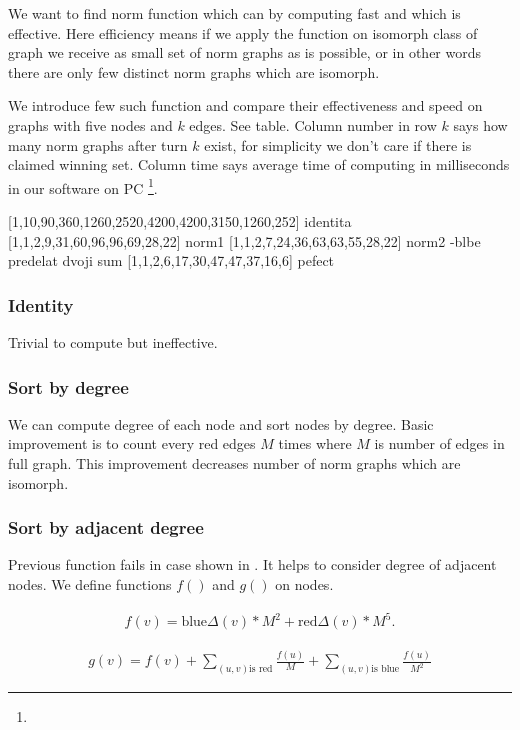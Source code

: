 We want to find norm function which can by computing fast and
which is effective. Here efficiency means if we apply the function on
isomorph class of graph we receive as small set of norm graphs as is possible,
or in other words there are only few distinct norm graphs which are isomorph.

We introduce few such function and compare their effectiveness and speed on
graphs with five nodes and $k$ edges. See table. Column number in row $k$ says
how many norm graphs after turn $k$ exist, for simplicity we don't care if
there is claimed winning set. Column time says average time of computing in
milliseconds in our software on PC \footnote{}.
 

[1,10,90,360,1260,2520,4200,4200,3150,1260,252] identita
[1,1,2,9,31,60,96,96,69,28,22] norm1
[1,1,2,7,24,36,63,63,55,28,22] norm2 -blbe predelat dvoji sum
[1,1,2,6,17,30,47,47,37,16,6] pefect

\subsubsection{Identity}
Trivial to compute but ineffective.

\subsubsection{Sort by degree}
We can compute degree of each node and sort nodes by degree. Basic improvement
is to count every red edges $M$ times where $M$ is number of edges in full
graph. This improvement decreases number of norm graphs which are isomorph.

\subsubsection{Sort by adjacent degree} Previous function fails in case shown
in . It helps to consider
degree of adjacent nodes. We define functions $f()$ and $g()$ on nodes. 

\begin{eqnarray*} 
f(v) = \mbox{blue}\Delta (v) * M^2 + \mbox{red}\Delta (v) * M^5.
\end{eqnarray*}

\begin{eqnarray*} 
g(v) = f(v) + \sum_{(u,v) \mbox{is red}}{\frac{f(u)}{M}} + \sum_{(u,v) \mbox{is blue}}{\frac{f(u)}{M^2}}
\end{eqnarray*}

